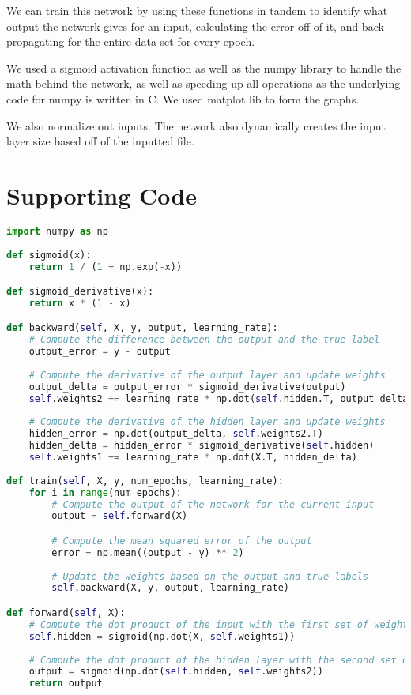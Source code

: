 \documentclass[12pt]{article}
\begin{document}
We can train this network by using these functions in tandem to identify what output the network gives for an input, calculating the error off of it, and back-propagating for the entire data set for every epoch. 

We used a sigmoid activation function as well as the numpy library to handle the math behind the network, as well as speeding up all operations as the underlying code for numpy is written in C. We used matplot lib to form the graphs.

We also normalize out inputs. The network also dynamically creates the input layer size based off of the inputted file. 

\section{Supporting Code}
\begin{lstlisting}[language=Python, caption=Python example]
import numpy as np
    
def sigmoid(x):
    return 1 / (1 + np.exp(-x))

def sigmoid_derivative(x):
    return x * (1 - x)

def backward(self, X, y, output, learning_rate):
    # Compute the difference between the output and the true label
    output_error = y - output
    
    # Compute the derivative of the output layer and update weights
    output_delta = output_error * sigmoid_derivative(output)
    self.weights2 += learning_rate * np.dot(self.hidden.T, output_delta)
    
    # Compute the derivative of the hidden layer and update weights
    hidden_error = np.dot(output_delta, self.weights2.T)
    hidden_delta = hidden_error * sigmoid_derivative(self.hidden)
    self.weights1 += learning_rate * np.dot(X.T, hidden_delta)
    
def train(self, X, y, num_epochs, learning_rate):
    for i in range(num_epochs):
        # Compute the output of the network for the current input
        output = self.forward(X)

        # Compute the mean squared error of the output
        error = np.mean((output - y) ** 2)
    
        # Update the weights based on the output and true labels
        self.backward(X, y, output, learning_rate)

def forward(self, X):
    # Compute the dot product of the input with the first set of weights, and apply the sigmoid function
    self.hidden = sigmoid(np.dot(X, self.weights1))
    
    # Compute the dot product of the hidden layer with the second set of weights, and apply the sigmoid function
    output = sigmoid(np.dot(self.hidden, self.weights2))
    return output
        
\end{lstlisting}
\end{document}
